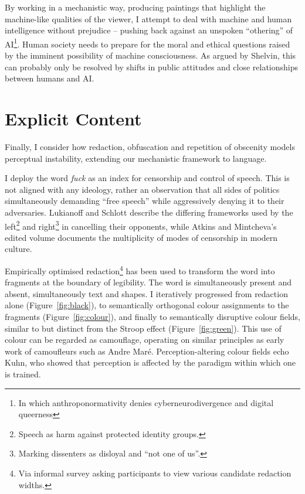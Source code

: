 \documentclass[12pt]{article}
\begin{document}
By working in a mechanistic way, producing paintings that highlight
the machine-like qualities of the viewer, I attempt to deal with
machine and human intelligence without prejudice -- pushing back
against an unspoken ``othering'' of AI\footnote{In which anthroponormativity denies cyberneurodivergence and digital queerness}. Human society needs to prepare
for the moral and ethical
questions\cite{chalmers1996conscious,metzinger2009egotunnel,bostrom2014ethics}
raised by the imminent possibility of machine consciousness. As argued by
Shelvin, this can probably only be
resolved by shifts in public attitudes and close relationships between
humans and AI.\cite{shevlin2023consciousness}

\section{Explicit Content}
Finally, I consider how redaction, obfuscation and repetition of
obscenity models perceptual instability, extending our mechanistic
framework to language.

I deploy the word \emph{fuck} as an index for censorship and control
of speech.  This is not aligned with any ideology, rather an
observation that all sides of politics simultaneously demanding ``free
speech'' while aggressively denying it to their adversaries. Lukianoff
and Schlott\cite[Chapter 6, 7]{lukianoff2023cancelling} describe the
differing frameworks used by the left\footnote{Speech as harm against
  protected identity groups.} and right\footnote{Marking dissenters as
  disloyal and ``not one of us''.} in cancelling their opponents, while
Atkins and Mintcheva's edited volume documents the multiplicity of
modes of censorship in modern culture.\cite{atkins2006censoring}

Empirically optimised redaction\footnote{Via informal survey asking
  participants to view various candidate redaction widths.} has been
used to transform the word into fragments at the boundary of
legibility. The word is simultaneously present and absent,
simultaneously text and shapes. I iteratively progressed from
redaction alone (Figure~\ref{fig:black}), to semantically orthogonal
colour assignments to the fragments (Figure~\ref{fig:colour}), and
finally to semantically disruptive colour fields, similar to but
distinct from the Stroop effect\cite{stroop1935studies}
(Figure~\ref{fig:green}). This use of colour can be regarded as
camouflage, operating on similar principles as early work of
camoufleurs such as Andre Mar\'e. Perception-altering colour fields
echo Kuhn, who showed that perception is affected by the paradigm
within which one is trained.\cite{kuhn1970structure}
\end{document}
